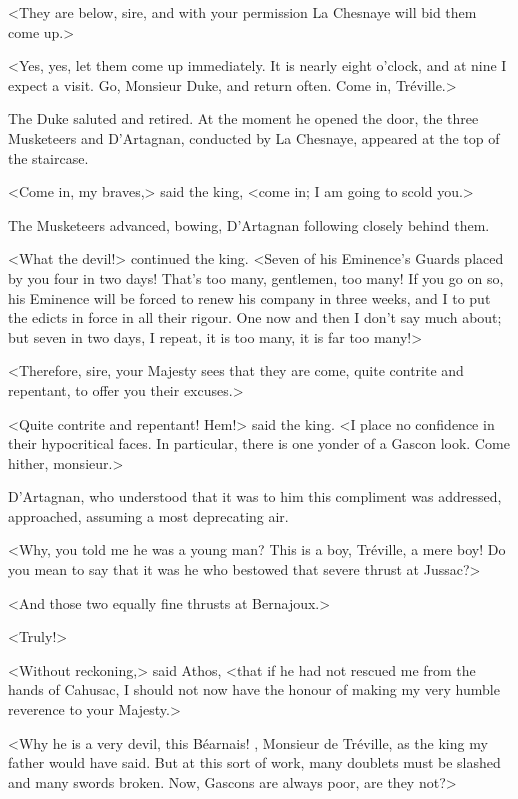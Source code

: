 <They are below, sire, and with your permission La Chesnaye will bid them come up.> 

<Yes, yes, let them come up immediately. It is nearly eight o'clock, and at nine I expect a visit. Go, Monsieur Duke, and return often. Come in, Tréville.> 

The Duke saluted and retired. At the moment he opened the door, the three Musketeers and D'Artagnan, conducted by La Chesnaye, appeared at the top of the staircase. 

<Come in, my braves,> said the king, <come in; I am going to scold you.> 

The Musketeers advanced, bowing, D'Artagnan following closely behind them. 

<What the devil!> continued the king. <Seven of his Eminence's Guards placed  by you four in two days! That's too many, gentlemen, too many! If you go on so, his Eminence will be forced to renew his company in three weeks, and I to put the edicts in force in all their rigour. One now and then I don't say much about; but seven in two days, I repeat, it is too many, it is far too many!> 

<Therefore, sire, your Majesty sees that they are come, quite contrite and repentant, to offer you their excuses.> 

<Quite contrite and repentant! Hem!> said the king. <I place no confidence in their hypocritical faces. In particular, there is one yonder of a Gascon look. Come hither, monsieur.> 

D'Artagnan, who understood that it was to him this compliment was addressed, approached, assuming a most deprecating air. 

<Why, you told me he was a young man? This is a boy, Tréville, a mere boy! Do you mean to say that it was he who bestowed that severe thrust at Jussac?> 

<And those two equally fine thrusts at Bernajoux.> 

<Truly!> 

<Without reckoning,> said Athos, <that if he had not rescued me from the hands of Cahusac, I should not now have the honour of making my very humble reverence to your Majesty.> 

<Why he is a very devil, this Béarnais! , Monsieur de Tréville, as the king my father would have said. But at this sort of work, many doublets must be slashed and many swords broken. Now, Gascons are always poor, are they not?> 

